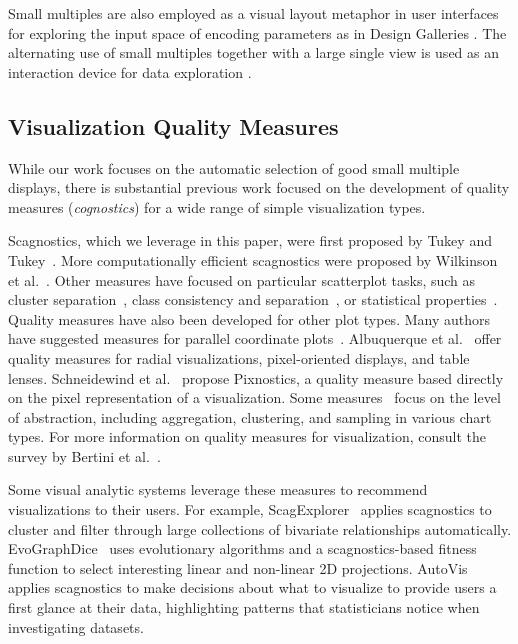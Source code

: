 
Small multiples are also employed as a visual layout metaphor in user interfaces for exploring the input space of encoding parameters as in Design Galleries \cite{marks1997}. The alternating use of small multiples together with a large single view is used as an interaction device for data exploration \cite{van2013}.

\subsection{Visualization Quality Measures}
While our work focuses on the automatic selection of good small multiple displays, there is substantial previous work focused on the development of quality measures (\emph{cognostics}) for a wide range of simple visualization types. 

Scagnostics, which we leverage in this paper, were first proposed by Tukey and Tukey~\cite{Tukey1982, Tukey1985}. More computationally efficient scagnostics were proposed by Wilkinson et al.~\cite{Wilkinson2005, Wilkinson2008}. Other measures have focused on particular scatterplot tasks, such as cluster separation~\cite{Sedlmair2012, Tatu2009}, class consistency and separation~\cite{Sips2009, Schafer2013}, or statistical properties~\cite{Kandel2012, Seo2005, Piringer2008}.
Quality measures have also been developed for other plot types. Many authors have suggested measures for parallel coordinate plots~\cite{Ankerst1998, Dasgupta2010, Johansson2009, Yang2003}. Albuquerque et al.~\cite{Albuquerque2010} offer quality measures for radial visualizations, pixel-oriented displays, and table lenses. Schneidewind et al.~\cite{Schneidewind2006} propose Pixnostics, a quality measure based directly on the pixel representation of a visualization. Some measures~\cite{Bertini2006, Cui2006, Yang2003} focus on the level of abstraction, including aggregation, clustering, and sampling in various chart types. For more information on quality measures for visualization, consult the survey by Bertini et al.~\cite{Bertini2011}. 

Some visual analytic systems leverage these measures to recommend visualizations to their users. For example, ScagExplorer~\cite{Dang2014} applies scagnostics to cluster and filter through large collections of bivariate relationships automatically.
EvoGraphDice~\cite{Boukhelifa2013} uses evolutionary algorithms and a scagnostics-based fitness function to select interesting linear and non-linear 2D projections.
AutoVis~\cite{Wills2010} applies scagnostics to make decisions about what to visualize to provide users a first glance at their data, highlighting patterns that statisticians notice when investigating datasets.

